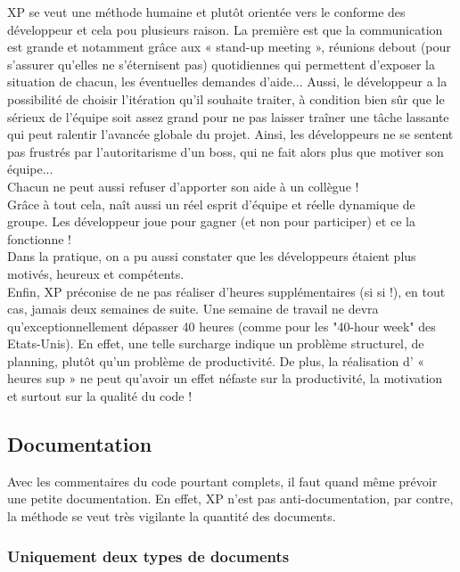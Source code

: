 \documentclass[]{article}
\begin{document}
XP se veut une méthode humaine et plutôt orientée vers le conforme des
développeur et cela pou plusieurs raison. La première est que la
communication est grande et notamment grâce aux « stand-up meeting »,
réunions debout (pour s'assurer qu'elles ne s'éternisent pas)
quotidiennes qui permettent d'exposer la situation de chacun, les
éventuelles demandes d'aide... Aussi, le développeur a la possibilité de
choisir l'itération qu'il souhaite traiter, à condition bien sûr que le
sérieux de l'équipe soit assez grand pour ne pas laisser traîner une
tâche lassante qui peut ralentir l'avancée globale du projet. Ainsi, les
développeurs ne se sentent pas frustrés par l'autoritarisme d'un boss,
qui ne fait alors plus que motiver son équipe...\\
Chacun ne peut aussi refuser d'apporter son aide à un collègue !\\
Grâce à tout cela, naît aussi un réel esprit d'équipe et réelle
dynamique de groupe. Les développeur joue pour gagner (et non pour
participer) et ce la fonctionne !~\\
Dans la pratique, on a pu aussi constater que les développeurs étaient
plus motivés, heureux et compétents.\\
Enfin, XP préconise de ne pas réaliser d'heures supplémentaires (si si
!), en tout cas, jamais deux semaines de suite. Une semaine de travail
ne devra qu'exceptionnellement dépasser 40 heures (comme pour les
"40-hour week" des Etats-Unis). En effet, une telle surcharge indique un
problème structurel, de planning, plutôt qu'un problème de productivité.
De plus, la réalisation d' « heures sup » ne peut qu'avoir un effet
néfaste sur la productivité, la motivation et surtout sur la qualité du
code !




\hypertarget{documentation}{%
\subsection{\texorpdfstring{\textbf{Documentation}}{Documentation}}\label{documentation}}

Avec les commentaires du code pourtant complets, il faut quand même
prévoir une petite documentation. En effet, XP n'est pas
anti-documentation, par contre, la méthode se veut très vigilante la
quantité des documents.




\hypertarget{uniquement-deux-types-de-documents}{%
\subsubsection{Uniquement deux types de
documents}\label{uniquement-deux-types-de-documents}}
\end{document}
